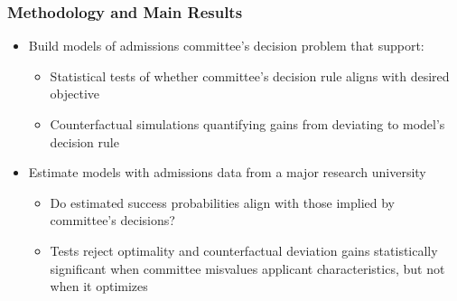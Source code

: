 \documentclass[12pt, aspectratio=169]{beamer}
\begin{document}
\begin{frame}[label=mmr]
\frametitle{Methodology and Main Results}
\begin{itemize}
\item Build models of admissions committee's decision problem that support:
\vspace{5pt}
\begin{itemize}
\item Statistical tests of whether committee's decision rule aligns with desired objective
\vspace{5pt}
\item Counterfactual simulations quantifying gains from deviating to model's decision rule
\vspace{10pt}
\end{itemize}
\item Estimate models with admissions data from a major research university
\vspace{5pt}
\begin{itemize}
\item Do estimated success probabilities align with those implied by committee's decisions?\!\!\!\!
\vspace{5pt}
\item Tests reject optimality and counterfactual deviation gains statistically significant when committee misvalues applicant characteristics, but not when it optimizes
\end{itemize}
\end{itemize}
\end{frame}
\end{document}
